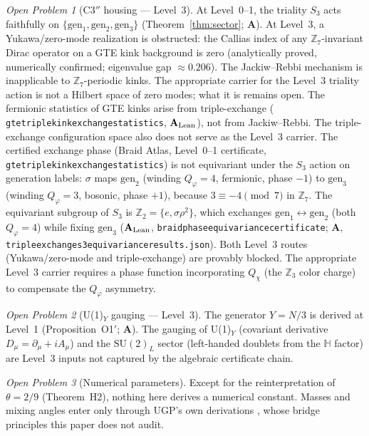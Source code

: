\documentclass[11pt]{article}
\theoremstyle{remark}
\newtheorem{openprob}{Open Problem}
\newcommand{\lean}[1]{%
  \penalty-100
  \begingroup\def\_{\textunderscore\allowbreak}\texttt{#1}\endgroup}
\newcommand{\CatA}{\textbf{A}}
\newcommand{\CatAL}{\ensuremath{\textbf{A}_{\rm Lean}}}
\begin{document}
\begin{openprob}[C$3''$ housing --- Level~3]
\label{op:c3pp}
At Level~0--1, the triality $S_3$ acts faithfully on $\{\mathrm{gen}_1,
\mathrm{gen}_2, \mathrm{gen}_3\}$ (Theorem~\ref{thm:sector}; \CatA).
At Level~3, a Yukawa/zero-mode realization is obstructed: the Callias index
of any $\mathbb{Z}_7$-invariant Dirac operator on a GTE kink background is zero
(analytically proved, numerically confirmed; eigenvalue gap ${\approx}0.206$).
The Jackiw--Rebbi mechanism is inapplicable to $\mathbb{Z}_7$-periodic kinks.
The appropriate carrier for the Level~3 triality action is not a Hilbert space
of zero modes; what it is remains open.
The fermionic statistics of GTE kinks arise from triple-exchange
\cite{SpivackGTECompleteFramework} (\lean{gte\_triple\_kink\_exchange\_statistics}, \CatAL),
not from Jackiw--Rebbi.
The triple-exchange configuration space also does not serve as the Level~3 carrier.
The certified exchange phase (Braid Atlas, Level~0--1 certificate,
\lean{gte\_triple\_kink\_exchange\_statistics}) is not equivariant under the
$S_3$ action on generation labels: $\sigma$ maps $\mathrm{gen}_2$
(winding $Q_\varphi = 4$, fermionic, phase $-1$) to $\mathrm{gen}_3$
(winding $Q_\varphi = 3$, bosonic, phase $+1$), because
$3 \equiv -4\pmod{7}$ in $\mathbb{Z}_7$.
The equivariant subgroup of $S_3$ is $\mathbb{Z}_2 = \{e,\sigma\rho^2\}$,
which exchanges $\mathrm{gen}_1\leftrightarrow\mathrm{gen}_2$
(both $Q_\varphi = 4$) while fixing $\mathrm{gen}_3$
(\CatAL, \lean{braid\_phase\_equivariance\_certificate};
\CatA, \lean{triple\_exchange\_s3\_equivariance\_results.json}).
Both Level~3 routes (Yukawa/zero-mode and triple-exchange) are provably blocked.
The appropriate Level~3 carrier requires a phase function incorporating $Q_\chi$
(the $\mathbb{Z}_3$ color charge) to compensate the $Q_\varphi$ asymmetry.
\end{openprob}

\begin{openprob}[U(1)$_Y$ gauging --- Level~3]
The generator $Y = N/3$ is derived at Level~1 (Proposition~O1$'$; \CatA).
The gauging of U(1)$_Y$ (covariant derivative $D_\mu = \partial_\mu + iA_\mu$) and
the $\mathrm{SU}(2)_L$ sector (left-handed doublets from the $\mathbb{H}$ factor)
are Level~3 inputs not captured by the algebraic certificate chain.
\end{openprob}

\begin{openprob}[Numerical parameters]
Except for the reinterpretation of $\theta = 2/9$ (Theorem~H2), nothing
here derives a numerical constant.
Masses and mixing angles enter only through UGP's own derivations
\cite{SpivackGTECompleteFramework,Spivack2026_Koide,Spivack2026_CyclotomicMass},
whose bridge principles this paper does not audit.
\end{openprob}
\end{document}
